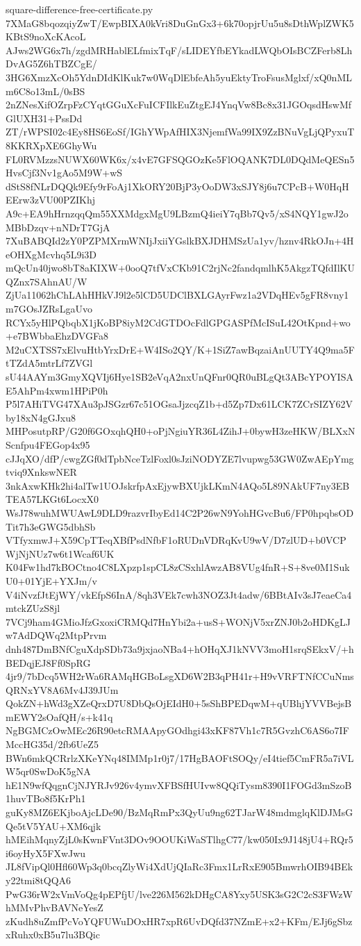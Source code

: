 \documentclass[11pt]{article}
\theoremstyle{definition}
\theoremstyle{remark}
\begin{document}
\begin{filecontents*}[overwrite]{square-difference-free-certificate.py}
7XMaG8bqozqiyZwT/EwpBIXA0kVri8DuGnGx3+6k70opjrUu5u8sDthWplZWK5KBtS9noXcKAcoL
AJws2WG6x7h/zgdMRHablELfmixTqF/sLIDEYfbEYkadLWQbOIsBCZFerb8LhDvAG5Z6hTBZCgE/
3HG6XmzXcOh5YdnDIdKlKuk7w0WqDlEbfeAh5yuEktyTroFsusMglxf/xQ0nMLm6C8o13mL/0sBS
2nZNesXifOZrpFzCYqtGGuXcFuICFIlkEuZtgEJ4YnqVw8Bc8x31JGOqsdHswMfGlUXH31+PssDd
ZT/rWPSI02c4Ey8HS6EoSf/IGhYWpAfHIX3NjemfWa99IX9ZzBNuVgLjQPyxuT8KKRXpXE6GhyWu
FL0RVMzzsNUWX60WK6x/x4vE7GFSQGOzKe5FlOQANK7DL0DQdMeQESn5HvsCjf3Nv1gAo5M9W+wS
dStS8fNLrDQQk9Efy9rFoAj1XkORY20BjP3yOoDW3xSJY8j6u7CPcB+W0HqHEErw3zVU00PZIKhj
A9c+EA9hHrnzqqQm55XXMdgxMgU9LBzmQ4ieiY7qBb7Qv5/xS4NQY1gwJ2oMBbDzqv+nNDrT7GjA
7XuBABQId2zY0PZPMXrmWNIjJxiiYGslkBXJDHMSzUa1yv/hznv4RkOJn+4HeOHXgMcvhq5L9i3D
mQcUn40jwo8bT8aKIXW+0ooQ7tfVxCKb91C2rjNc2fandqmlhK5AkgzTQfdIlKUQZnx7SAhnAU/W
ZjUa11062hChLAhHHkVJ9l2e5lCD5UDClBXLGAyrFwz1a2VDqHEv5gFR8vny1m7GOsJZRsLgaUvo
RCYx5yHlPQbqbX1jKoBP8iyM2CdGTDOcFdlGPGASPfMcISuL42OtKpnd+wo+e7BWbbaEhzDVGFa8
M2uCXTSS7xElvuHtbYrxDrE+W4ISo2QY/K+1SiZ7awBqzaiAnUUTY4Q9ma5FtTZdA5mtrLf7ZVGl
sU44AAYm3GmyXQVIj6Hye1SB2eVqA2nxUnQFnr0QR0uBLgQt3ABcYPOYISAE5AhPm4xwm1HPiP0h
P5l7AHiTVG47XAu3pJSGzr67c51OGsaJjzcqZ1b+d5Zp7Dx61LCK7ZCrSIZY62Vby18xN4gGJxu8
MHPosutpRP/G20f6GOxqhQH0+oPjNgiuYR36L4ZihJ+0bywH3zeHKW/BLXxNScnfpu4FEGop4x95
cJJqXO/dfP/cwgZGf0dTpbNceTzlFoxl0sJziNODYZE7lvupwg53GW0ZwAEpYmgtviq9XnkswNER
3nkAxwKHk2hi4alTw1UOJskrfpAxEjywBXUjkLKmN4AQo5L89NAkUF7ny3EBTEA57LKGt6LocxX0
WsJ78wuhMWUAwL9DLD9razvrIbyEd14C2P26wN9YohHGvcBu6/FP0hpqbsODTit7h3eGWG5dbhSb
VTfyxmwJ+X59CpTTeqXBfPsdNfbF1oRUDnVDRqKvU9wV/D7zlUD+b0VCPWjNjNUz7w6t1Wcaf6UK
K04Fw1hd7kBOCtno4C8LXpzp1spCL8zCSxhlAwzAB8VUg4fnR+S+8ve0M1SukU0+01YjE+YXJm/v
V4iNvzfJtEjWY/vkEfpS6InA/8qh3VEk7cwh3NOZ3Jt4adw/6BBtAIv3sJ7eaeCa4mtckZUzS8jl
7VCj9ham4GMioJfzGxoxiCRMQd7HnYbi2a+usS+WONjV5xrZNJ0b2oHDKgLJw7AdDQWq2MtpPrvm
dnh487DmBNfCguXdpSDb73a9jxjaoNBa4+hOHqXJ1kNVV3moH1srqSEkxV/+hBEDqjEJ8Ff0SpRG
4jr9/7bDcq5WH2rWa6RAMqHGBoLsgXD6W2B3qPH41r+H9vVRFTNfCCuNmsQRNxYV8A6Mv4J39JUm
QokZN+hWd3gXZeQrxD7U8DbQsOjEIdH0+5sShBPEDqwM+qUBhjYVVBejsBmEWY2sOafQH/s+k41q
NgBGMCzOwMEc26R90etcRMAApyGOdhgi43xKF87Vh1c7R5GvzhC6AS6o7IFMccHG35d/2fb6UeZ5
BWn6mkQCRrlzXKeYNq48IMMp1r0j7/17HgBAOFtSOQy/eI4tief5CmFR5a7iVLW5qr0SwDoK5gNA
hE1N9wfQqgnCjNJYRJv926v4ymvXFBSfHUIvw8QQiTysm8390I1FOGd3mSzoB1huvTBo8f5KrPh1
guKy8MZ6EKjboAjcLDe90/BzMqRmPx3QyUu9ng62TJarW48mdmglqKlDJMsGQe5tV5YAU+XM6qjk
hMEihMqnyZjL0sKwnFVnt3DOv9OOUKiWaSTlhgC77/kw050Ix9J148jU4+RQr5i6oyHyX5FXwJwu
JL8fVipQl0Hfl60Wp3q0bcqZlyWi4XdUjQIaRc3Fmx1LrRxE905BmwrhOIB94BEky22tmi8tQQA6
PwG36rW2xVmVoQg4pEPfjU/lve226M562kDHgCA8Yxy5USK3sG2C2cS3FWzWhMMvPhvBAVNeYesZ
zKudh8uZmfPcVoYQFUWuDOxHR7xpR6UvDQfd37NZmE+x2+KFm/EJj6gSbzxRuhx0xB5u7lu3BQic

\end{filecontents*}
\end{document}
